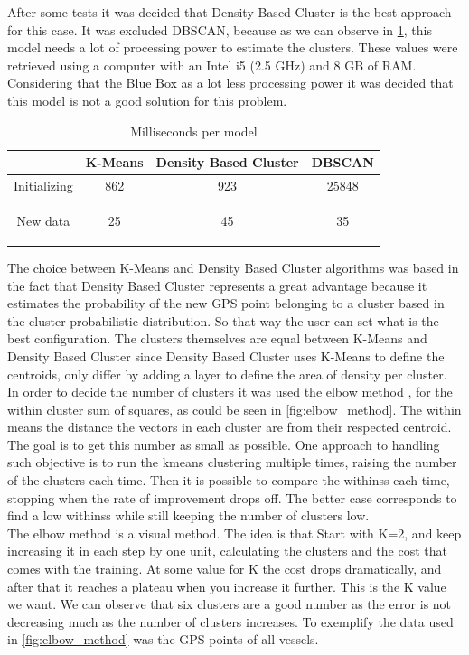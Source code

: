 After some tests it was decided that Density Based Cluster is the best approach for this case. It was excluded DBSCAN, because as we can observe in \ref{table:mill_per_moodle}, this model needs a lot of processing power to estimate the clusters. These values were retrieved using a computer with an Intel i5 (2.5 GHz) and 8 GB of RAM. Considering that the Blue Box as a lot less processing power it was decided that this model is not a good solution for this problem.
\\

\begin {table}[H]
\begin{center}
\begin{tabular}{c|c|c|c}
             & \textbf{K-Means} & \textbf{Density Based Cluster} & \textbf{DBSCAN} \\
\hline
Initializing & 862              & 923                             & 25848           \\

New data     & 25               & 45                            & 35  
           
\label{table:mill_per_moodle}
\end{tabular}
\caption {Milliseconds per model}
\end{center}
\end {table}

The choice between K-Means and Density Based Cluster algorithms was based in the fact that Density Based Cluster represents a great advantage because it estimates the probability of the new GPS point belonging to a cluster based in the cluster probabilistic distribution. So that way the user can set what is the best configuration. The clusters themselves are equal between K-Means and Density Based Cluster since Density Based Cluster uses K-Means to define the centroids, only differ by adding a layer to define the area of density per cluster.
\\
In order to decide the number of clusters it was used the elbow method \cite{Kodinariya2013ReviewOD}, for the within cluster sum of squares, as could be seen in \ref{fig:elbow_method}. The within means the distance the vectors in each cluster are from their respected centroid. The goal is to get this number as small as possible. One approach to handling such objective is to run the kmeans clustering multiple times, raising the number of the clusters each time. Then it is possible to compare the withinss each time, stopping when the rate of improvement drops off. The better case corresponds to find a low withinss while still keeping the number of clusters low.\\
The elbow method is a visual method. The idea is that Start with K=2, and keep increasing it in each step by one unit, calculating the clusters and the cost that comes with the training. At some value for K the cost drops dramatically, and after that it reaches a plateau when you increase it further. This is the K value we want. We can observe that six clusters are a good number as the error is not decreasing much as the number of clusters increases. To exemplify the data used in \ref{fig:elbow_method} was the GPS points of all vessels.


